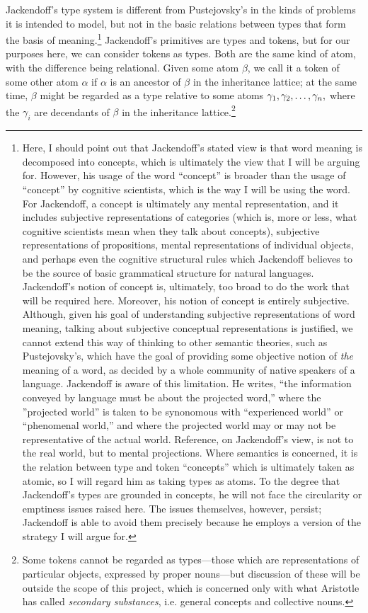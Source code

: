 \documentclass[12pt]{amsart}
\begin{document}
Jackendoff's type system is different from Pustejovsky's in the kinds of problems it is intended to model, but not in the basic relations between types that form the basis of meaning.\footnote{Here, I should point out that Jackendoff's stated view is that word meaning is decomposed into concepts, which is ultimately the view that I will be arguing for. However, his usage of the word ``concept'' is broader than the usage of ``concept'' by cognitive scientists, which is the way I will be using the word. For Jackendoff, a concept is ultimately any mental representation, and it includes subjective representations of categories (which is, more or less, what cognitive scientists mean when they talk about concepts), subjective representations of propositions, mental representations of individual objects, and perhaps even the cognitive structural rules which Jackendoff believes to be the source of basic grammatical structure for natural languages. Jackendoff's notion of concept is, ultimately, too broad to do the work that will be required here. Moreover, his notion of concept is entirely subjective. Although, given his goal of understanding subjective representations of word meaning, talking about subjective conceptual representations is justified, we cannot extend this way of thinking to other semantic theories, such as Pustejovsky's, which have the goal of providing some objective notion of \emph{the} meaning of a word, as decided by a whole community of native speakers of a language. Jackendoff is aware of this limitation. He writes, ``the information conveyed by language must be about the projected word,'' where the ''projected world'' is taken to be synonomous with ``experienced world'' or ``phenomenal world,'' and where the projected world may or may not be representative of the actual world.  \cite[pp. 28-29]{jackendoff_semantics_1983} Reference, on Jackendoff's view, is not to the real world, but to mental projections. \cite[p. 36]{jackendoff_semantics_1983} Where semantics is concerned, it is the relation between type and token ``concepts'' which is ultimately taken as atomic, so I will regard him as taking types as atoms. To the degree that Jackendoff's types are grounded in concepts, he will not face the circularity or emptiness issues raised here. The issues themselves, however, persist; Jackendoff is able to avoid them precisely because he employs a version of the strategy I will argue for.} Jackendoff's primitives are types and tokens, but for our purposes here, we can consider tokens as types. Both are the same kind of atom, with the difference being relational. Given some atom $\beta$, we call it a token of some other atom $\alpha$ if $\alpha$ is an ancestor of $\beta$ in the inheritance lattice; at the same time, $\beta$ might be regarded as a type relative to some atoms $\gamma_1,\gamma_2,\mathellipsis,\gamma_n,$ where the $\gamma_i$ are decendants of $\beta$ in the inheritance lattice.\footnote{Some tokens cannot be regarded as types---those which are representations of particular objects, expressed by proper nouns---but discussion of these will be outside the scope of this project, which is concerned only with what Aristotle has called \emph{secondary substances}, i.e. general concepts and collective nouns.}
\end{document}
